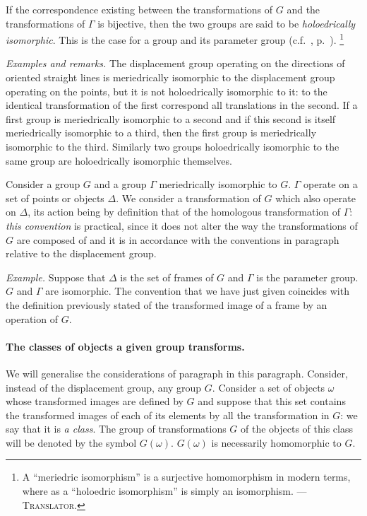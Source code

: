 If the correspondence existing between the transformations of $G$ and the transformations of $\Gamma$ is bijective, then the two groups are said to be \emph{holoedrically isomorphic}. This is the case for a group and its parameter group (c.f.~, p.~\pageref{sec:79}). \footnote{A ``meriedric isomorphism'' is a surjective homomorphism in modern terms, where as a ``holoedric isomorphism'' is simply an isomorphism. ---\textsc{Translator.}}

\somespace

{\small
\emph{Examples and remarks.} The displacement group operating on the directions of oriented straight lines is meriedrically isomorphic to the displacement group operating on the points, but it is not holoedrically isomorphic to it: to the identical transformation of the first correspond all translations in the second. If a first group is meriedrically isomorphic to a second and if this second is itself meriedrically isomorphic to a third, then the first group is meriedrically isomorphic to the third. Similarly two groups holoedrically isomorphic to the same group are holoedrically isomorphic themselves.
}

\somespace

Consider a group $G$ and a group $\Gamma$ meriedrically isomorphic to $G$. $\Gamma$ operate on a set of points or objects $\Delta$. We consider a transformation of $G$ which also operate on $\Delta$, its action being by definition that of the homologous transformation of $\Gamma$: \emph{this convention} is practical, since it does not alter the way the transformations of $G$ are composed of and it is in accordance with the conventions in paragraph  relative to the displacement group.

\somespace
{\small
\emph{Example.} Suppose that $\Delta$ is the set of frames of $G$ and $\Gamma$ is the parameter group. $G$ and $\Gamma$ are isomorphic. The convention that we have just given coincides with the definition previously stated of the transformed image of a frame by an operation of $G$.
}

\paragraph{The classes of objects a given group transforms.}
\label{sec:91}
We will generalise the considerations of paragraph  in this paragraph. Consider, instead of the displacement group, any group $G$. Consider a set of objects $\omega$ whose transformed images are defined by $G$ and suppose that this set contains the transformed images of each of its elements by all the transformation in $G$: we say that it is \emph{a class}. The group of transformations $G$ of the objects of this class will be denoted by the symbol $G(\omega)$. $G(\omega)$ is necessarily homomorphic to $G$.

